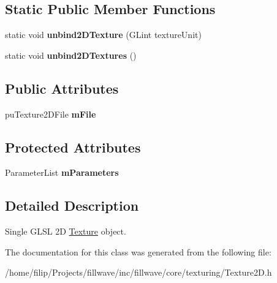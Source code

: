 \subsection*{Static Public Member Functions}
\begin{DoxyCompactItemize}
\item 
static void {\bfseries unbind2\+D\+Texture} (G\+Lint texture\+Unit)\hypertarget{classflw_1_1flc_1_1Texture2D_af55b2c3f280ee2fe859af13690b4c9ec}{}\label{classflw_1_1flc_1_1Texture2D_af55b2c3f280ee2fe859af13690b4c9ec}

\item 
static void {\bfseries unbind2\+D\+Textures} ()\hypertarget{classflw_1_1flc_1_1Texture2D_a83b0eeaab09346f734a3c00727d423d1}{}\label{classflw_1_1flc_1_1Texture2D_a83b0eeaab09346f734a3c00727d423d1}

\end{DoxyCompactItemize}
\subsection*{Public Attributes}
\begin{DoxyCompactItemize}
\item 
pu\+Texture2\+D\+File {\bfseries m\+File}\hypertarget{classflw_1_1flc_1_1Texture2D_af422f8e2f1593a26049e70fd36026c1a}{}\label{classflw_1_1flc_1_1Texture2D_af422f8e2f1593a26049e70fd36026c1a}

\end{DoxyCompactItemize}
\subsection*{Protected Attributes}
\begin{DoxyCompactItemize}
\item 
Parameter\+List {\bfseries m\+Parameters}\hypertarget{classflw_1_1flc_1_1Texture2D_a018726676df0258939c42bfe38f8fc63}{}\label{classflw_1_1flc_1_1Texture2D_a018726676df0258939c42bfe38f8fc63}

\end{DoxyCompactItemize}


\subsection{Detailed Description}
Single G\+L\+SL 2D \hyperlink{classflw_1_1flc_1_1Texture}{Texture} object. 

The documentation for this class was generated from the following file\+:\begin{DoxyCompactItemize}
\item 
/home/filip/\+Projects/fillwave/inc/fillwave/core/texturing/Texture2\+D.\+h\end{DoxyCompactItemize}
